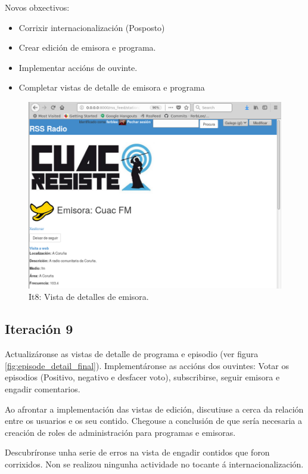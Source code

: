 Novos obxectivos:
\begin{itemize}
	\item Corrixir internacionalización (Posposto)
	\item Crear edición de emisora e programa.
	\item Implementar accións de ouvinte.
	\item Completar vistas de detalle de emisora e programa
\end{itemize}

\begin{figure}[h]
	\centering
	\includegraphics[scale=0.4,keepaspectratio=true]{./images/station_detail_final.png}
	\caption{It8: Vista de detalles de emisora.}
	\label{fig:station_detail_final}
\end{figure}


\subsection{Iteración 9}

Actualizáronse as vistas de detalle de programa e episodio (ver figura \ref{fig:episode_detail_final}). Implementáronse as accións dos ouvintes: Votar os episodios (Positivo, negativo e desfacer voto), subscribirse, seguir emisora e engadir comentarios.

Ao afrontar a implementación das vistas de edición, discutiuse a cerca da relación entre os usuarios e os seu contido. Chegouse a conclusión de que sería necesaria a creación de roles de administración para programas e emisoras.

Descubríronse unha serie de erros na vista de engadir contidos que foron corrixidos. Non se realizou ningunha actividade no tocante á internacionalización.

